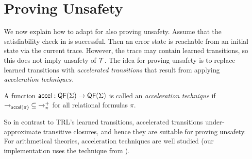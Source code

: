 \section{Proving Unsafety}\label{sec:Unsafety}

We now explain how to adapt  for also proving unsafety.
%
Assume that the satisfiability check in  is successful.
%
Then an error state is reachable from an initial state via the current trace.
%
However, the trace may contain learned transitions, so this does not imply unsafety of $\mathcal{T}$.
%
The idea for proving unsafety is to replace learned transitions with \emph{accelerated transitions} that result from applying \emph{acceleration techniques}.
%
\begin{definition}[Acceleration]
  A function $\mathsf{accel}: \mathsf{QF}(\Sigma) \to \mathsf{QF}(\Sigma)$ is called an \emph{acceleration technique} if ${\to_{\mathsf{accel}(\pi)}} \subseteq {\to^+_{\pi}}$ for all relational formulas $\pi$.
\end{definition}
%
So in contrast to TRL's learned transitions, accelerated transitions under-ap\-prox\-i\-mate transitive closures, and hence they are suitable for proving unsafety.
%
For arithmetical theories, acceleration techniques are well studied \cite{kroening13,bozga10,acceleration-calculus} (our implementation uses the technique from \cite{acceleration-calculus}).

